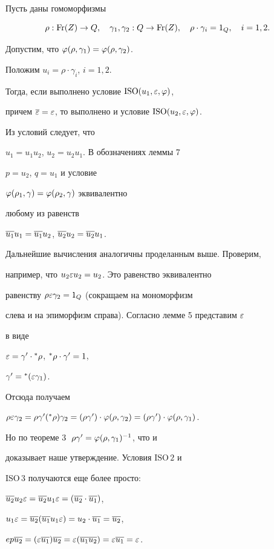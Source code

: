 \begin{lem}


Пусть даны гомоморфизмы


$$


\rho: \Fr(Z)\to Q,\quad \gamma_1,\gamma_2: Q\to \Fr(Z),\quad


\rho\cdot\gamma_i=1_Q,\quad i=1,2.


$$


Допустим, что $\varphi(\rho,\gamma_1)=\varphi(\rho,\gamma_2)$.


Положим $u_i=\rho\cdot\gamma_i$, $i=1,2$.


Тогда, если выполнено условие ${\mathrm{ISO}}(u_1,\varepsilon,\varphi)$,


причем $ \overline{\varepsilon}=\varepsilon$, то выполнено и условие ${\mathrm{ISO}}(u_2,\varepsilon,\varphi)$.


\end{lem}





\begin{pf} Из условий следует, что


$u_1=u_1u_2$, $u_2=u_2 u_1$. В обозначениях леммы 7


$p=u_2$, $q=u_1$ и условие


$\varphi(\rho_1,\gamma)=\varphi(\rho_2,\gamma)$ эквивалентно


любому из равенств


$\overline{u_1}u_1= \overline{u_1}u_2$, $\overline{u_2}u_2=\overline{u_2}u_1$.


Дальнейшие вычисления аналогичны проделанным выше. Проверим,


например, что $u_2\varepsilon u_2=u_2$. Это равенство эквивалентно


равенству $\rho \varepsilon \gamma_2=1_Q$ (сокращаем на мономорфизм


слева и на эпиморфизм справа). Согласно лемме 5 представим $\varepsilon$


в виде


$\varepsilon=\gamma'\cdot{}^{\ast}{\rho}$, ${}^{\ast}{\rho}\cdot\gamma'=1$,


$\gamma'={}^{\ast}{(\varepsilon\gamma_1)}$.


Отсюда получаем


$\rho\ep\gamma_2 = \rho\gamma'(\a{\rho})\gamma_2=


(\rho\gamma')\cdot\f(\rho,\gamma_2)=


(\rho\gamma')\cdot\f(\rho,\gamma_1)$.


Но по теореме 3 $\;\rho\gamma'=\varphi(\rho,\gamma_1)^{-1} $, что и


доказывает наше утверждение. Условия ${\mathrm{ISO\,2}}$ и


${\mathrm{ISO\,3}} $ получаются еще более просто:


$\overline{u_2}u_2\varepsilon=\overline{u_2}u_1\varepsilon=(\overline{u_2}\cdot \overline{u_1})$,


$u_1\varepsilon= \overline{u_2}(\overline{u_1} u_1\varepsilon ) = u_2\cdot\overline{u_1}=\overline{u_2}$,


$ep\overline{u_2}=(\varepsilon\overline{u_1})\overline{u_2}=\varepsilon(\overline{u_1}\overline{u_2})=\varepsilon\overline{u_1}=\varepsilon$.


\end{pf}





